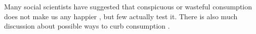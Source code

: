 \documentclass[10pt, letterpaper]{article}
\begin{document}
\begin{spacing}{1.4}
Many social scientists have suggested that conspicuous or wasteful consumption
does not make us any happier  \cite{csikszentmihalyi99, frank04, frank05,
  frank12}, but few actually test it. There is also much discussion about
possible ways to curb consumption \cite{dietz14B,dietz15, dumas87}.
%

\end{spacing}
\end{document}
